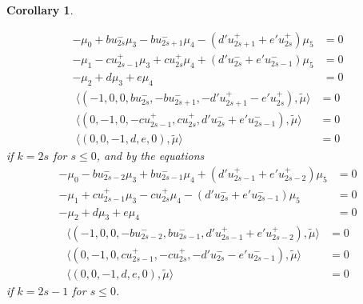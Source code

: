 \documentclass{amsart}
\newtheorem{corollary}[theorem]{Corollary}
\numberwithin{theorem}{section}
\begin{document}
\begin{corollary}
\begin{enumerate}
\begin{align*}
          -\mu_0 + b u_{2s}^- \mu_3 - b u_{2s+1}^- \mu_4 - (d' u_{2s+1}^+ + e' u_{2s}^+) \mu_5 &= 0\\
          -\mu_1 - c u_{2s-1}^+ \mu_3 + c u_{2s}^+ \mu_4 + (d' u_{2s}^- + e' u_{2s-1}^-) \mu_5 &= 0\\
          -\mu_2 + d \mu_3 + e \mu_4 &= 0
        \end{align*}
        \begin{align*}
          \langle (-1,0,0, b u_{2s}^-, -b u_{2s+1}^-, -d' u_{2s+1}^+ - e' u_{2s}^+), \tilde\mu \rangle &= 0\\
          \langle (0,-1,0, -c u_{2s-1}^+, c u_{2s}^+, d' u_{2s}^- + e' u_{2s-1}^-), \tilde\mu \rangle &= 0\\
          \langle (0,0,-1, d, e, 0), \tilde\mu \rangle &= 0
        \end{align*}
        if $k=2s$ for $s \le 0$, and by the equations
        \begin{align*}
          -\mu_0 - b u_{2s-2}^- \mu_3 + b u_{2s-1}^- \mu_4 + (d' u_{2s-1}^+ + e' u_{2s-2}^+) \mu_5 &= 0\\
          -\mu_1 + c u_{2s-1}^+ \mu_3 - c u_{2s}^+ \mu_4 - (d' u_{2s}^- + e' u_{2s-1}^-) \mu_5 &= 0\\
          -\mu_2 + d \mu_3 + e \mu_4 &= 0
        \end{align*}
        \begin{align*}
          \langle (-1,0,0, -b u_{2s-2}^-, b u_{2s-1}^-, d' u_{2s-1}^+ + e' u_{2s-2}^+), \tilde\mu \rangle &= 0\\
          \langle (0,-1,0, c u_{2s-1}^+, -c u_{2s}^+, -d' u_{2s}^- - e' u_{2s-1}^-), \tilde\mu \rangle &= 0\\
          \langle (0,0,-1, d, e, 0), \tilde\mu \rangle &= 0
        \end{align*}
        if $k=2s-1$ for $s \le 0$.
    \end{enumerate}
  \end{corollary}
\end{document}
